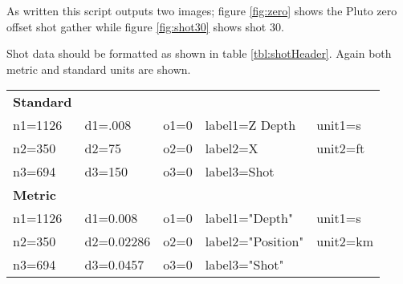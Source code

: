 As written this script outputs two images; figure \ref{fig:zero} shows the Pluto zero offset shot gather while figure 
\ref{fig:shot30} shows shot 30.  

{
\tiny

\normalsize
}



Shot data should be formatted as shown in table \ref{tbl:shotHeader}.  Again both metric and standard units are shown.  

{
\begin{tabular}[t]{|lllll|}
	\hline
	\textbf{Standard} &     &                       &                       &                \\
	n1=1126      &	    d1=.008	&   o1=0	&	label1=Z Depth	&	unit1=s  \\
	n2=350       &	    d2=75	&   o2=0	&	label2=X	&	unit2=ft \\
	n3=694       &	    d3=150	&   o3=0	&	label3=Shot 	&                \\
	\textbf{Metric}   &    		&               &                       &                \\
	    n1=1126  &      d1=0.008    &   o1=0        &	label1="Depth"  &	unit1=s  \\
	    n2=350   &      d2=0.02286  &   o2=0        &  	label2="Position" &	unit2=km \\
	    n3=694   &      d3=0.0457   &   o3=0        &  	label3="Shot"	&		 \\
	\hline
\end{tabular}
}



